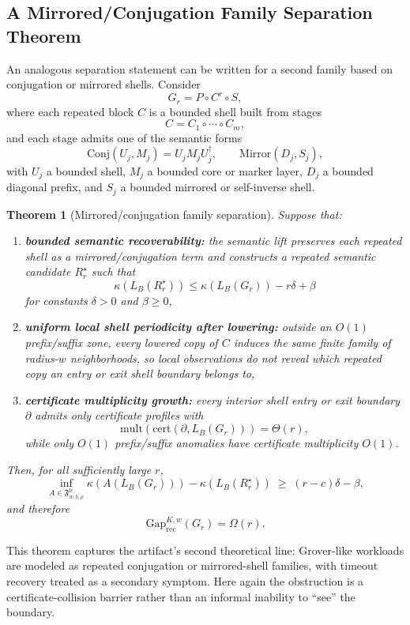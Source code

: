 \documentclass[11pt]{article}
\newtheorem{theorem}{Theorem}
\begin{document}
\subsection{A Mirrored/Conjugation Family Separation Theorem}

An analogous separation statement can be written for a second family based on
conjugation or mirrored shells. Consider
\[
G_r = P \circ C^r \circ S,
\]
where each repeated block $C$ is a bounded shell built from stages
\[
C = C_1 \circ \cdots \circ C_m,
\]
and each stage admits one of the semantic forms
\[
\mathrm{Conj}(U_j,M_j) = U_j M_j U_j^\dagger,
\qquad
\mathrm{Mirror}(D_j,S_j),
\]
with $U_j$ a bounded shell, $M_j$ a bounded core or marker layer, $D_j$ a
bounded diagonal prefix, and $S_j$ a bounded mirrored or self-inverse shell.

\begin{theorem}[Mirrored/conjugation family separation]
\label{thm:mirrored-separation}
Suppose that:
\begin{enumerate}[leftmargin=1.5em]
    \item \textbf{bounded semantic recoverability:} the semantic lift preserves each repeated shell as a mirrored/conjugation term and constructs a repeated semantic candidate $R_r^\star$ such that
    \[
    \kappa(L_B(R_r^\star)) \le \kappa(L_B(G_r)) - r\delta + \beta
    \]
    for constants $\delta > 0$ and $\beta \ge 0$,
    \item \textbf{uniform local shell periodicity after lowering:} outside an $O(1)$ prefix/suffix zone, every lowered copy of $C$ induces the same finite family of radius-$w$ neighborhoods, so local observations do not reveal which repeated copy an entry or exit shell boundary belongs to,
    \item \textbf{certificate multiplicity growth:} every interior shell entry or exit boundary $\partial$ admits only certificate profiles with
    \[
    \mathrm{mult}(\mathrm{cert}(\partial, L_B(G_r))) = \Theta(r),
    \]
    while only $O(1)$ prefix/suffix anomalies have certificate multiplicity $O(1)$.
\end{enumerate}
Then, for all sufficiently large $r$,
\[
\inf_{A \in \mathfrak{F}^{\mathrm{lc}}_{w,b,\rho}} \kappa(A(L_B(G_r))) - \kappa(L_B(R_r^\star))
\;\ge\;
(r-c)\delta - \beta,
\]
and therefore
\[
\mathrm{Gap}^{K,w}_{\mathrm{rec}}(G_r) = \Omega(r).
\]
\end{theorem}

This theorem captures the artifact's second theoretical line:
Grover-like workloads are modeled as repeated conjugation or mirrored-shell
families, with timeout recovery treated as a secondary symptom. Here again the
obstruction is a certificate-collision barrier rather than an informal inability
to ``see'' the boundary.
\end{document}
